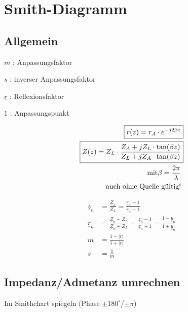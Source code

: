 \section{Smith-Diagramm}

\subsection{Allgemein} \label{sec:Smith_All}


$m$             : Anpassungsfaktor

$s$             : inverser Anpassungsfaktor

$\underline{r}$ : Reflexionsfaktor

$1$             : Anpassungspunkt

\begin{center}
    \begin{align*}
        \Aboxed{r(z)  = r_A \cdot e^{-j2\beta z}}                                              \\
        \Aboxed{Z(z)  = Z_L\cdot\frac{Z_A+jZ_L\cdot\tan(\beta z)}{Z_L+jZ_A\cdot\tan(\beta z)}} \\
        \text{mit} \beta = \frac{2\pi}{\lambda}                                                \\
        \text{auch ohne Quelle gültig!}
    \end{align*}
    
\end{center}
\begin{align*}
    \underline{z}_n & = \frac{\underline{Z}_n}{Z_L} = \frac{\underline{r}_n + 1}{\underline{r}_n - 1}                                                                                                                \\
    \underline{r}_n & = \frac{\underline{Z}_n-Z_L}{\underline{Z}_n+Z_L}= \frac{\underline{z}_n-1}{\underline{z}_n+1}    = \frac{1-\underline{y}_n}{1+\underline{y}_n} \\
    m               & = \frac{1-|\underline{r}|}{1+|\underline{r}|}                                                                                                   \\
    s               & = \frac{1}{m}
\end{align*}

\subsection{Impedanz/Admetanz umrechnen}
Im Smithchart spiegeln (Phase $\pm 180^{\circ}$/$\pm \pi$)

